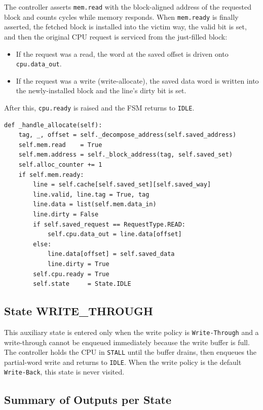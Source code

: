 \documentclass[11pt,a4paper]{article}
\begin{document}
The controller asserts \texttt{mem.read} with the block-aligned address of
the requested block and counts cycles while memory responds. When
\texttt{mem.ready} is finally asserted, the fetched block is installed into
the victim way, the valid bit is set, and then the original CPU request is
serviced from the just-filled block:

\begin{itemize}[leftmargin=1.4em,itemsep=0.1em]
    \item If the request was a read, the word at the saved offset is driven
    onto \texttt{cpu.data\_out}.
    \item If the request was a write (write-allocate), the saved data word is
    written into the newly-installed block and the line's dirty bit is set.
\end{itemize}

After this, \texttt{cpu.ready} is raised and the FSM returns to \texttt{IDLE}.

\begin{lstlisting}
def _handle_allocate(self):
    tag, _, offset = self._decompose_address(self.saved_address)
    self.mem.read    = True
    self.mem.address = self._block_address(tag, self.saved_set)
    self.alloc_counter += 1
    if self.mem.ready:
        line = self.cache[self.saved_set][self.saved_way]
        line.valid, line.tag = True, tag
        line.data = list(self.mem.data_in)
        line.dirty = False
        if self.saved_request == RequestType.READ:
            self.cpu.data_out = line.data[offset]
        else:
            line.data[offset] = self.saved_data
            line.dirty = True
        self.cpu.ready = True
        self.state     = State.IDLE
\end{lstlisting}

\subsection{State WRITE\_THROUGH}

This auxiliary state is entered only when the write policy is
\texttt{Write-Through} and a write-through cannot be enqueued immediately
because the write buffer is full. The controller holds the CPU in
\texttt{STALL} until the buffer drains, then enqueues the partial-word write
and returns to \texttt{IDLE}. When the write policy is the default
\texttt{Write-Back}, this state is never visited.

\subsection{Summary of Outputs per State}
\end{document}

